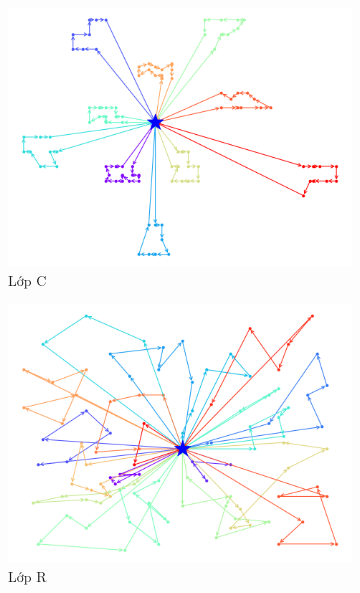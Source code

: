 \begin{figure}[H] %
	\label{fig:perf_ct_c2}
	\begin{subfigure}{.3\textwidth}
		\centering
		\includegraphics[width=1\linewidth]{figures/routes_c101.png}
		\caption{Lớp C}
		\label{fig:route_c}
	\end{subfigure}%
	\begin{subfigure}{.3\textwidth}
		\centering
		\includegraphics[width=1\linewidth]{figures/routes_r101.png}
		\caption{Lớp R}
		\label{fig:route_r}
	\end{subfigure}
	\begin{subfigure}{.3\textwidth}
		\centering

\end{subfigure}
\end{figure}
